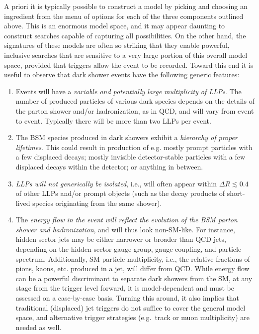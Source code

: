 \begin{enumerate}
A priori it is typically possible to construct a model by picking and choosing an ingredient from the menu of options for each of the three components outlined above. This is an enormous model space, and it may appear daunting to construct searches capable of capturing all possibilities. On the other hand, the signatures of these models are often so striking that they enable powerful, inclusive searches that are sensitive to a very large portion of this overall model space, provided that triggers allow the event to be recorded. Toward this end it is useful to observe that dark shower events have the following generic features:
%
\begin {enumerate}

\item Events will have a {\it variable and potentially large multiplicity of LLPs}.
The number of produced particles of various dark species depends on the details of the parton shower and/or hadronization, as in QCD, and will vary from event to event. Typically there will be more than two LLPs per event.

\item The BSM species produced in dark showers exhibit a {\it hierarchy of proper lifetimes}.
This could result in production of e.g. mostly prompt particles with a few displaced decays; mostly invisible detector-stable particles with a few displaced decays within the detector; or anything in between.

\item {\it LLPs will not generically be isolated}, i.e., will often appear within $\Delta R \lesssim 0.4$ of other LLPs and/or prompt objects (such as the decay products of short-lived species originating from the same shower).

\item The {\it energy flow in the event will reflect the evolution of the BSM parton shower and hadronization}, and will thus look non-SM-like. For instance, hidden sector jets may be either narrower or broader than QCD jets, depending on the hidden sector gauge group, gauge coupling, and particle spectrum. Additionally, SM particle multiplicity, i.e., the relative fractions of pions, kaons, etc. produced in a jet, will differ from QCD. While energy flow can be a powerful discriminant to separate dark showers from the SM, at any stage from the trigger level forward, it is model-dependent and must be assessed on a case-by-case basis. Turning this around, it also implies that traditional (displaced) jet triggers do not suffice to cover the general model space, and alternative trigger strategies (e.g.~track or muon multiplicity) are needed as well.


\end{enumerate}
\end{enumerate}
